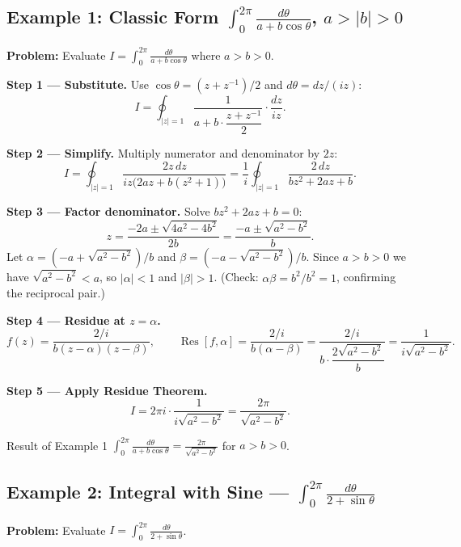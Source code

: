 \documentclass[12pt,a4paper]{article}
\begin{document}
\subsection*{Example 1: Classic Form $\displaystyle\int_0^{2\pi}\frac{d\theta}{a+b\cos\theta}$, $a>|b|>0$}

\textbf{Problem:} Evaluate $\displaystyle I = \int_0^{2\pi}\frac{d\theta}{a+b\cos\theta}$ where $a > b > 0$.

\textbf{Step 1 — Substitute.} Use $\cos\theta = (z+z^{-1})/2$ and $d\theta = dz/(iz)$:
\[
  I = \oint_{|z|=1} \frac{1}{a + b\cdot\dfrac{z+z^{-1}}{2}} \cdot \frac{dz}{iz}.
\]

\textbf{Step 2 — Simplify.} Multiply numerator and denominator by $2z$:
\[
  I = \oint_{|z|=1} \frac{2z\,dz}{iz\bigl(2az + b(z^2+1)\bigr)}
    = \frac{1}{i}\oint_{|z|=1} \frac{2\,dz}{bz^2 + 2az + b}.
\]

\textbf{Step 3 — Factor denominator.} Solve $bz^2 + 2az + b = 0$:
\[
  z = \frac{-2a \pm \sqrt{4a^2 - 4b^2}}{2b}
    = \frac{-a \pm \sqrt{a^2 - b^2}}{b}.
\]
Let $\alpha = (-a + \sqrt{a^2-b^2})/b$ and $\beta = (-a - \sqrt{a^2-b^2})/b$.
Since $a > b > 0$ we have $\sqrt{a^2-b^2} < a$, so $|\alpha| < 1$ and $|\beta| > 1$.
(Check: $\alpha\beta = b^2/b^2 = 1$, confirming the reciprocal pair.)

\textbf{Step 4 — Residue at $z = \alpha$.}
\[
  f(z) = \frac{2/i}{b(z-\alpha)(z-\beta)}, \qquad
  \operatorname{Res}[f,\alpha]
    = \frac{2/i}{b(\alpha - \beta)}
    = \frac{2/i}{b \cdot \dfrac{2\sqrt{a^2-b^2}}{b}}
    = \frac{1}{i\sqrt{a^2-b^2}}.
\]

\textbf{Step 5 — Apply Residue Theorem.}
\[
  I = 2\pi i \cdot \frac{1}{i\sqrt{a^2-b^2}} = \frac{2\pi}{\sqrt{a^2-b^2}}.
\]

\begin{learnbox}{Result of Example 1}
$\displaystyle\int_0^{2\pi}\frac{d\theta}{a+b\cos\theta} = \frac{2\pi}{\sqrt{a^2-b^2}}$
for $a > b > 0$.
\end{learnbox}

\subsection*{Example 2: Integral with Sine --- $\displaystyle\int_0^{2\pi}\frac{d\theta}{2+\sin\theta}$}

\textbf{Problem:} Evaluate $\displaystyle I = \int_0^{2\pi}\frac{d\theta}{2+\sin\theta}$.
\end{document}
